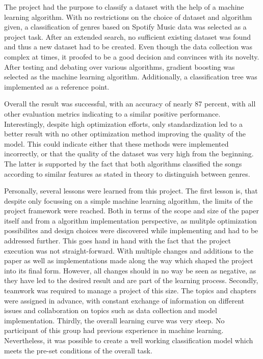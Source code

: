         The project had the purpose to classify a dataset with the help of a machine learning algorithm. With no restrictions on the choice of dataset and algorithm given, 
        a classification of genres based on Spotify Music data was selected as a project task. After an extended search, 
        no sufficient existing dataset was found and thus a new dataset had to be created. Even though the data collection was complex at times, 
        it proofed to be a good decision and convinces with its novelty. After testing and debating over various algorithms, gradient boosting was
        selected as the machine learning algorithm. Additionally, a classification tree was implemented as a reference point.

        Overall the result was successful, with an accuracy of nearly 87 percent, with all other evaluation metrics indicating to a similar positive performance.
        Interestingly, despite high optimization efforts, only standardization led to a better result with no other optimization method improving the quality of the model. 
        This could indicate either that these methods were implemented incorrectly, or that the quality of the dataset was very high from the beginning. 
        The latter is supported by the fact that both algorithms classified the songs according to similar features as stated in theory to distinguish between genres.

        Personally, several lessons were learned from this project. The first lesson is, that despite only focussing on a 
        simple machine learning algorithm, the limits of the project framework were reached. Both in terms of the scope and size of the
        paper itself and from a algorithm implementation perspective, as mulitple optimization possibilites and design choices were 
        discovered while implementing and had to be addressed further. This goes hand in hand with the fact that the project execution was not straight-forward.
        With multiple changes and additions to the paper as well as implementations made along the way which shaped the 
        project into its final form. However, all changes should in no way be seen as negative, as they have led to the desired result and 
        are part of the learning process.
        Secondly, teamwork was required to manage a project of this size. The topics and chapters were assigned in advance, with constant exchange 
        of information on different issues and collaboration on topics such as data collection and model implementation.
        Thirdly, the overall learning curve was very steep. No participant of this group had previous experience in machine learning.
        Nevertheless, it was possible to create a well working classification model which meets the pre-set conditions of the overall task.

